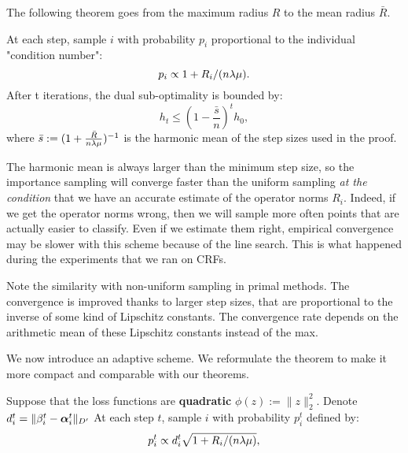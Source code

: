 \begin{subappendices}
	The following theorem goes from the maximum radius $R$ to the mean radius $\bar R$.

	\begin{theorem}
		\label{app:importance}
		At each step, sample $i$ with probability $p_i$ proportional to the individual "condition number":
		\begin{equation}
			p_i \propto 1+R_i/(n \lambda \mu).
		\end{equation}
		After t iterations, the dual sub-optimality is bounded by:
		\begin{equation}
			h_t \leq (1-\frac{\bar s}{n})^t  h_0,
		\end{equation}
		where $\bar s := (1 + \frac{\bar R}{n \lambda \mu})^{-1}$ is the harmonic mean of the step sizes used in the proof.
	\end{theorem}

	The harmonic mean is always larger than the minimum step size, so the importance sampling will converge faster than the uniform sampling \textit{at the condition} that we have an accurate estimate of the operator norms $R_i$.
	Indeed, if we get the operator norms wrong, then we will sample more often points that are actually easier to classify.
	Even if we estimate them right, empirical convergence may be slower with this scheme because of the line search.
	This is what happened during the experiments that we ran on CRFs.

	Note the similarity with non-uniform sampling in primal methods.
	The convergence is improved thanks to larger step sizes, that are proportional to the inverse of some kind of Lipschitz constants.
	The convergence rate depends on the arithmetic mean of these Lipschitz constants instead of the max.

	We now introduce an adaptive scheme. We reformulate the theorem to make it more compact and comparable with our theorems.

	\begin{theorem}
		\label{app:csiba}
		Suppose that the loss functions are \textbf{quadratic} $\phi(z):=\|z\|_2^2$.
		Denote $d_i^t =  \|\beta_i^t - \boldsymbol{\alpha}_i^t \|_{D'}$
		At each step $t$, sample $i$ with probability $p_i^t$ defined by:
		\begin{equation}
			p_i^t \propto d_i^t \sqrt{1+R_i/(n \lambda \mu)},
		\end{equation}


\end{theorem}
\end{subappendices}
